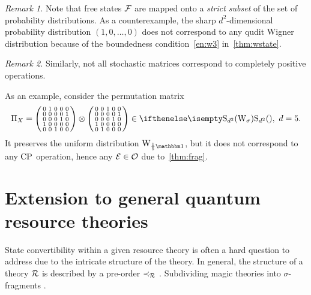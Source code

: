 \documentclass[pra,
aps,
twocolumn,
superscriptaddress,
groupedaddress,
nofootinbib,
reprint
]{revtex4-1}
\begin{document}
\emph{Remark 1.} Note that free states $\mathcal{F}$ are mapped onto a \emph{strict subset} of the set of probability distributions.
As a counterexample, the sharp $d^2$-dimensional probability distribution $(1, 0, \dots, 0)$ does not correspond to any qudit Wigner distribution because of the boundedness condition~\ref{en:w3} in~\cref{thm:wstate}.

\emph{Remark 2.} Similarly, not all stochastic matrices correspond to completely positive operations.

As an example, consider the permutation matrix
\begin{equation}
    \Pi_X = \begin{psmallmatrix}
        0 & 1 & 0 & 0 & 0 \\
        0 & 0 & 0 & 0 & 1 \\
        0 & 0 & 0 & 1 & 0 \\
        1 & 0 & 0 & 0 & 0 \\
        0 & 0 & 1 & 0 & 0
    \end{psmallmatrix} \otimes \begin{psmallmatrix}
        0 & 0 & 1 & 0 & 0 \\
        0 & 0 & 0 & 0 & 1 \\
        0 & 0 & 0 & 1 & 0 \\
        1 & 0 & 0 & 0 & 0 \\
        0 & 1 & 0 & 0 & 0    
    \end{psmallmatrix} \in \stochw,\ d=5.
\end{equation}
It preserves the uniform distribution $\W{\frac{1}{5}\id}{}$, but it does not correspond to any ${\rm{CP}}$ operation, hence any $\mathcal{E} \in \mathcal{O}$ due to~\cref{thm:frag}.


\section{Extension to general quantum resource theories}
\label{sec:frag}


State convertibility within a given resource theory is often a hard question to address due to the intricate structure of the theory.
In general, the structure of a theory $\mathcal{R}$ is described by a pre-order $\prec_{\mathcal{R}}$ .
Subdividing magic theories into $\sigma$-fragments .
\end{document}
